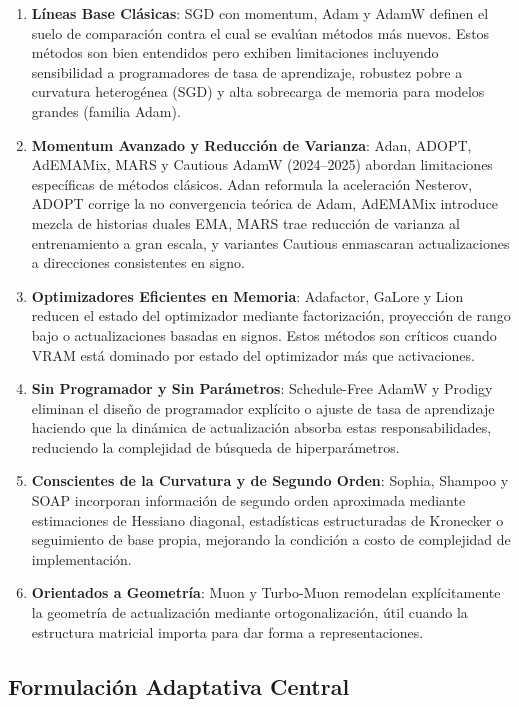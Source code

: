 \documentclass[11pt,a4paper]{article}
\begin{document}
\begin{enumerate}[leftmargin=*]
    \item \textbf{Líneas Base Clásicas}: SGD con momentum, Adam y AdamW definen el suelo de comparación contra el cual se evalúan métodos más nuevos. Estos métodos son bien entendidos pero exhiben limitaciones incluyendo sensibilidad a programadores de tasa de aprendizaje, robustez pobre a curvatura heterogénea (SGD) y alta sobrecarga de memoria para modelos grandes (familia Adam).
    \item \textbf{Momentum Avanzado y Reducción de Varianza}: Adan, ADOPT, AdEMAMix, MARS y Cautious AdamW (2024--2025) abordan limitaciones específicas de métodos clásicos. Adan reformula la aceleración Nesterov, ADOPT corrige la no convergencia teórica de Adam, AdEMAMix introduce mezcla de historias duales EMA, MARS trae reducción de varianza al entrenamiento a gran escala, y variantes Cautious enmascaran actualizaciones a direcciones consistentes en signo.
    \item \textbf{Optimizadores Eficientes en Memoria}: Adafactor, GaLore y Lion reducen el estado del optimizador mediante factorización, proyección de rango bajo o actualizaciones basadas en signos. Estos métodos son críticos cuando VRAM está dominado por estado del optimizador más que activaciones.
    \item \textbf{Sin Programador y Sin Parámetros}: Schedule-Free AdamW y Prodigy eliminan el diseño de programador explícito o ajuste de tasa de aprendizaje haciendo que la dinámica de actualización absorba estas responsabilidades, reduciendo la complejidad de búsqueda de hiperparámetros.
    \item \textbf{Conscientes de la Curvatura y de Segundo Orden}: Sophia, Shampoo y SOAP incorporan información de segundo orden aproximada mediante estimaciones de Hessiano diagonal, estadísticas estructuradas de Kronecker o seguimiento de base propia, mejorando la condición a costo de complejidad de implementación.
    \item \textbf{Orientados a Geometría}: Muon y Turbo-Muon remodelan explícitamente la geometría de actualización mediante ortogonalización, útil cuando la estructura matricial importa para dar forma a representaciones.
\end{enumerate}

\subsection{Formulación Adaptativa Central}
\end{document}

